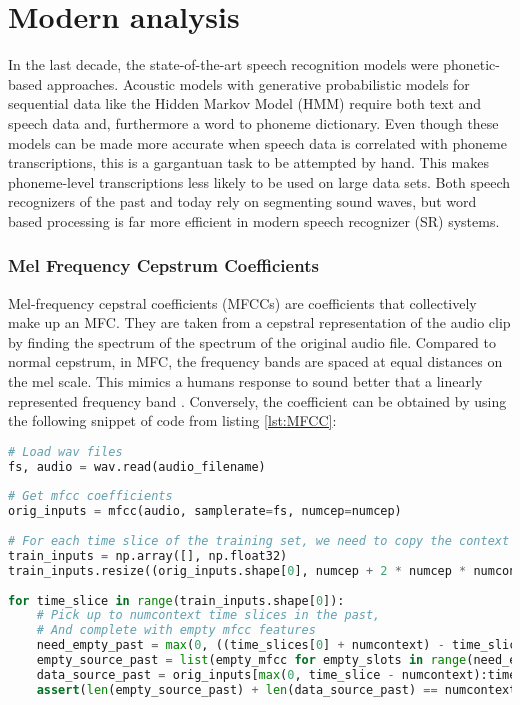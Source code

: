 \section{Modern analysis}
In the last decade, the state-of-the-art speech recognition models were phonetic-based
 approaches. Acoustic models with generative probabilistic models for sequential 
data like the Hidden Markov Model (HMM) require both text and speech data and,
furthermore a word to phoneme dictionary.
 Even though these models can be made more accurate when speech data is correlated with phoneme transcriptions, this is a gargantuan task to be attempted by hand. This makes 
 phoneme-level transcriptions less likely to be used on large data sets.
  Both  speech recognizers of the past and today  rely on segmenting sound waves, but word based processing is far more efficient in modern speech recognizer (SR) systems.
  
\subsubsection{Mel Frequency Cepstrum Coefficients}

Mel-frequency cepstral coefficients (MFCCs) are coefficients that collectively make up an MFC. 
They are taken from a cepstral representation of the audio clip by finding the spectrum of the spectrum of the original audio file.
 Compared to normal cepstrum, in MFC, the frequency bands are spaced at equal distances on the mel scale.
 This mimics a humans response to sound better that a linearly represented frequency band \cite{sahidullah2012design}.
Conversely, the coefficient can be obtained by using the following snippet of code 
from listing \ref{lst:MFCC}:


\begin{lstlisting}[language = Python, label=lst:MFCC, caption = Example code to obtain MFCC features.]
# Load wav files
fs, audio = wav.read(audio_filename)
 
# Get mfcc coefficients
orig_inputs = mfcc(audio, samplerate=fs, numcep=numcep)
 
# For each time slice of the training set, we need to copy the context this makes
train_inputs = np.array([], np.float32)
train_inputs.resize((orig_inputs.shape[0], numcep + 2 * numcep * numcontext))
 
for time_slice in range(train_inputs.shape[0]):
    # Pick up to numcontext time slices in the past,
    # And complete with empty mfcc features
    need_empty_past = max(0, ((time_slices[0] + numcontext) - time_slice))
    empty_source_past = list(empty_mfcc for empty_slots in range(need_empty_past))
    data_source_past = orig_inputs[max(0, time_slice - numcontext):time_slice]
    assert(len(empty_source_past) + len(data_source_past) == numcontext)
    
\end{lstlisting}

